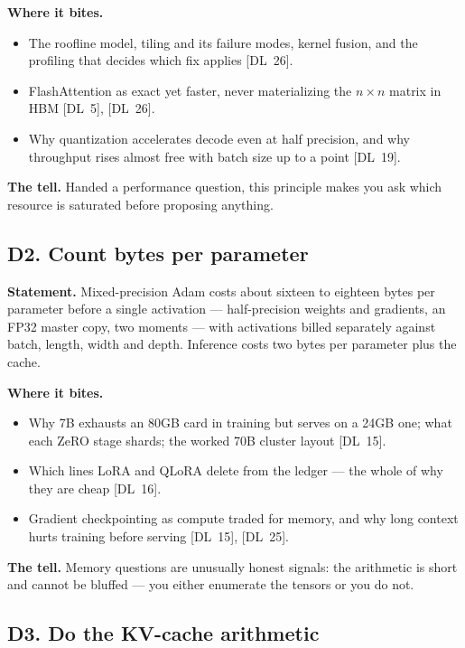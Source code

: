 \textbf{Where it bites.}
\begin{itemize}[itemsep=1pt,topsep=2pt,leftmargin=1.3em]
\item The roofline model, tiling and its failure modes, kernel fusion, and the profiling that decides which fix applies [DL~26].
\item FlashAttention as exact yet faster, never materializing the $n \times n$ matrix in HBM [DL~5], [DL~26].
\item Why quantization accelerates decode even at half precision, and why throughput rises almost free with batch size up to a point [DL~19].
\end{itemize}

\textbf{The tell.} Handed a performance question, this principle makes you ask which resource is saturated before proposing anything.

\subsection*{D2. Count bytes per parameter}

\textbf{Statement.} Mixed-precision Adam costs about sixteen to eighteen bytes per parameter before a single activation --- half-precision weights and gradients, an FP32 master copy, two moments --- with activations billed separately against batch, length, width and depth. Inference costs two bytes per parameter plus the cache.

\textbf{Where it bites.}
\begin{itemize}[itemsep=1pt,topsep=2pt,leftmargin=1.3em]
\item Why 7B exhausts an 80GB card in training but serves on a 24GB one; what each ZeRO stage shards; the worked 70B cluster layout [DL~15].
\item Which lines LoRA and QLoRA delete from the ledger --- the whole of why they are cheap [DL~16].
\item Gradient checkpointing as compute traded for memory, and why long context hurts training before serving [DL~15], [DL~25].
\end{itemize}

\textbf{The tell.} Memory questions are unusually honest signals: the arithmetic is short and cannot be bluffed --- you either enumerate the tensors or you do not.

\subsection*{D3. Do the KV-cache arithmetic}

